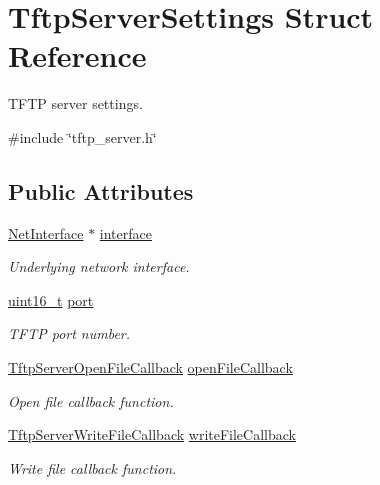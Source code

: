\hypertarget{structTftpServerSettings}{}\section{Tftp\+Server\+Settings Struct Reference}
\label{structTftpServerSettings}


T\+F\+TP server settings.  




{\ttfamily \#include \char`\"{}tftp\+\_\+server.\+h\char`\"{}}

\subsection*{Public Attributes}
\begin{DoxyCompactItemize}
\item 
\hyperlink{net_8h_a2234db8911a1148c9159979d8f5e0d6b}{Net\+Interface} $\ast$ \hyperlink{structTftpServerSettings_ada45e3b84aedec470a0d6fa4c2ff53ce}{interface}
\begin{DoxyCompactList}\small\item\em Underlying network interface. \end{DoxyCompactList}\item 
\hyperlink{stdint_8h_a273cf69d639a59973b6019625df33e30}{uint16\+\_\+t} \hyperlink{structTftpServerSettings_ac188b0c3119ad1c1ebeec4750e9123c8}{port}
\begin{DoxyCompactList}\small\item\em T\+F\+TP port number. \end{DoxyCompactList}\item 
\hyperlink{tftp__server_8h_a4cfed7d273d525cc9cc915c2e1f77018}{Tftp\+Server\+Open\+File\+Callback} \hyperlink{structTftpServerSettings_acb6820c295cca83e7d6559977d548835}{open\+File\+Callback}
\begin{DoxyCompactList}\small\item\em Open file callback function. \end{DoxyCompactList}\item 
\hyperlink{tftp__server_8h_ac3b6ec08b80dc8f9c1bc753d3541b613}{Tftp\+Server\+Write\+File\+Callback} \hyperlink{structTftpServerSettings_a26573cbdb9c307f46dec55de70ff7843}{write\+File\+Callback}
\begin{DoxyCompactList}\small\item\em Write file callback function. \end{DoxyCompactList}\item 

\end{DoxyCompactItemize}
